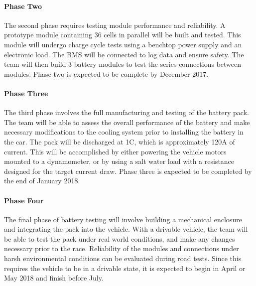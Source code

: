 \documentclass[10pt]{article}
\begin{document}
\paragraph{Phase Two}
The second phase requires testing module performance and reliability. A prototype module containing 36 cells in parallel will be built and tested. This module will undergo charge cycle tests using a benchtop power supply and an electronic load. The BMS will be connected to log data and ensure safety. The team will then build 3 battery modules to test the series connections between modules. Phase two is expected to be complete by December 2017. 

\paragraph{Phase Three}
The third phase involves the full manufacturing and testing of the battery pack. The team will be able to assess the overall performance of the battery and make necessary modifications to the cooling system prior to installing the battery in the car. The pack will be discharged at 1C, which is approximately 120A of current. This will be accomplished by either powering the vehicle motors mounted to a dynamometer, or by using a salt water load with a resistance designed for the target current draw. Phase three is expected to be completed by the end of January 2018.

\paragraph{Phase Four}
The final phase of battery testing will involve building a mechanical enclosure and integrating the pack into the vehicle. With a drivable vehicle, the team will be able to test the pack under real world conditions, and make any changes necessary prior to the race. Reliability of the modules and connections under harsh environmental conditions can be evaluated during road tests. Since this requires the vehicle to be in a drivable state, it is expected to begin in April or May 2018 and finish before July. 


%
\end{document}
